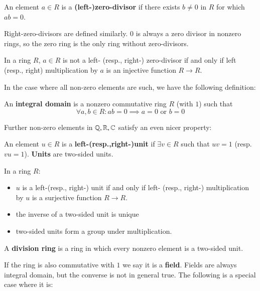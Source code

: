 \documentclass[12pt, a4paper, oneside, openright, titlepage]{book}
\begin{document}
\begin{defn}
    An element $a \in R$ is a \textbf{(left-)zero-divisor} if there exists $b \neq 0$ in $R$ for which $ab = 0$.
\end{defn}

Right-zero-divisors are defined similarly. $0$ is always a zero divisor in nonzero rings, so the zero ring is the only ring without zero-divisors.

\begin{prop}
    In a ring $R$, $a \in R$ is not a left- (resp., right-) zero-divisor if and only if left (resp., right) multiplication by $a$ is an injective function $R\rightarrow R$.
\end{prop}

In the case where all non-zero elements are such, we have the following definition:

\begin{defn}
    An \textbf{integral domain} is a nonzero commutative ring $R$ (with $1$) such that $$\forall a,b \in R:ab = 0\implies a =0\text{ or }b=0$$
\end{defn}

Further non-zero elements in $\mathbb Q,\mathbb R,\mathbb C$ satisfy an even nicer property:

\begin{defn}
    An element $u \in R$ is a \textbf{left-(resp.,right-)unit} if $\exists v\in R$ such that $uv = 1$ (resp. $vu = 1$). \textbf{Units} are two-sided units.
\end{defn}

\begin{prop}
    In a ring $R$: \begin{itemize}
        \item $u$ is a left-(resp., right-) unit if and only if left- (resp., right-) multiplication by $u$ is a surjective function $R\rightarrow R$.
        \item the inverse of a two-sided unit is unique
        \item two-sided units form a group under multiplication.
    \end{itemize}
\end{prop}


\begin{defn}
    A \textbf{division ring} is a ring in which every nonzero element is a two-sided unit.
\end{defn}

If the ring is also commutative with $1$ we say it is a \textbf{field}. Fields are always integral domain, but the converse is not in general true. The following is a special case where it is:
\end{document}
